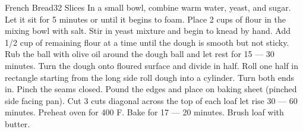 \documentclass[../main.tex]{subfiles}
\begin{document}
\begin{recipe}{French Bread}{32 Slices}{}
    In a small bowl, combine warm water, yeast,
    and sugar. Let it sit for 5 minutes or until
    it begins to foam.
    Place 2 cups of flour in the mixing bowl with salt.
    Stir in yeast mixture and begin to knead by hand.
    Add 1/2 cup of remaining flour at a time until the
    dough is smooth but not sticky.
    Rub the ball with olive oil around the dough ball
    and let rest for 15 --- 30 minutes. Turn the dough
    onto floured surface and divide in half. Roll one
    half in rectangle starting from the long side roll
    dough into a cylinder. Turn both ends in. Pinch the
    seams closed. Pound the edges and place on baking sheet
    (pinched side facing pan). Cut 3 cuts diagonal across
    the top of each loaf let rise 30 --- 60 minutes. Preheat
    oven for 400\degrees{} F. Bake for 17 --- 20 minutes.
    Brush loaf with butter.
\end{recipe}
\end{document}
